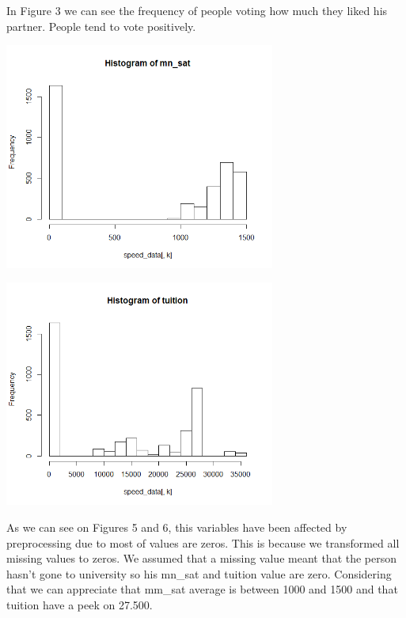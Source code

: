 In Figure 3 we can see the frequency of people voting how much they liked his partner. People tend to vote positively.

\begin{center}
\includegraphics[width=3.5in]{images/Hist_Plots_Analysis/hist_mn_sat.png}
\label{fig:aLabelForReferencing}
\end{center}

\begin{center}
\includegraphics[width=3.5in]{images/Hist_Plots_Analysis/hist_tuition.png}
\label{fig:aLabelForReferencing}
\end{center}

As we can see on Figures 5 and 6, this variables have been affected by preprocessing due to most of values are zeros. This is because we transformed all missing values to zeros. We assumed that a missing value meant that the person hasn't gone to university so his mn\_sat and tuition value are zero. Considering that we can appreciate that mm\_sat average is between 1000 and 1500 and that tuition have a peek on 27.500.

